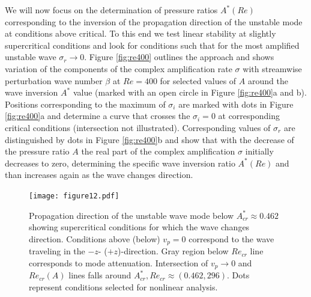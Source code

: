 \documentclass[lineno]{jfm}
\begin{document}
We will now focus on the determination of pressure ratios $A^*(Re)$ corresponding to the inversion of the propagation direction of the unstable mode at conditions above critical.
To this end we test linear stability at slightly supercritical conditions and look for conditions such that for the most amplified unstable wave $\sigma_r\to0$.
Figure \ref{fig:re400} outlines the approach and shows variation of the components of the complex amplification rate $\sigma$ with streamwise perturbation wave number $\beta$ at $Re=400$ for selected values of $A$ around the wave inversion $A^{*}$ value (marked with an open circle in Figure \ref{fig:re400}a and b).
Positions corresponding to the maximum of $\sigma_i$ are marked with dots in Figure \ref{fig:re400}a and determine a curve that crosses the $\sigma_i=0$ at corresponding critical conditions (intersection not illustrated).
Corresponding values of $\sigma_r$ are distinguished by dots in Figure \ref{fig:re400}b and show that with the decrease of the pressure ratio $A$
the real part of the complex amplification $\sigma$ initially decreases to zero, determining the specific wave inversion ratio $A^*(Re)$\deleted{,} and than increases again as the wave changes direction.

\begin{figure}
\centering
	\texttt{[image: figure12.pdf]}
	\caption{ Propagation direction of the unstable wave mode below $A^*_{cr}\approx0.462$ showing supercritical conditions for which the wave changes direction. Conditions above (below) $v_p=0$ correspond to the wave traveling in the $-z$- ($+z$)-direction. Gray region below $Re_{cr}$ line corresponds to mode attenuation. Intersection of $v_p\to0$ and $Re_{cr}(A)$ lines falls around
	$A^{*}_{cr}, Re_{cr}\approx(0.462,  296)$.
	 Dots represent conditions selected for nonlinear analysis.}
	\label{fig:zero_phase}
\end{figure}
\end{document}
